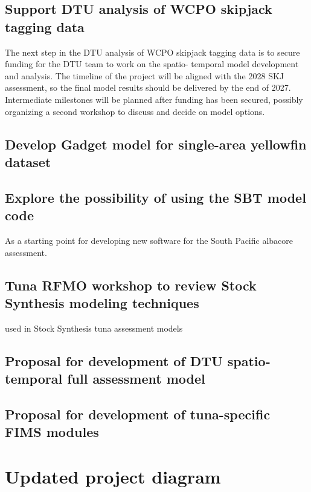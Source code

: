 \documentclass{SCreport}
\begin{document}
\subsection{Support DTU analysis of WCPO skipjack tagging data}
\label{sec:dtu-support-tagging}

The next step in the DTU analysis of WCPO skipjack tagging data is to secure
funding for the DTU team to work on the spatio- temporal model development and
analysis. The timeline of the project will be aligned with the 2028 SKJ
assessment, so the final model results should be delivered by the end of 2027.
Intermediate milestones will be planned after funding has been secured, possibly
organizing a second workshop to discuss and decide on model options.

\subsection{Develop Gadget model for single-area yellowfin dataset}
\label{sec:yft-gadget}

\subsection{Explore the possibility of using the SBT model code}

As a starting point for developing new software for the South Pacific albacore
assessment.

\subsection{Tuna RFMO workshop to review Stock Synthesis modeling techniques}
\label{sec:ss-workshop}

used in Stock Synthesis tuna assessment models

\subsection{Proposal for development of DTU spatio-temporal full assessment
  model}
\label{sec:dtu-support-assessment}

\subsection{Proposal for development of tuna-specific FIMS modules}

\section{Updated project diagram}
\end{document}
